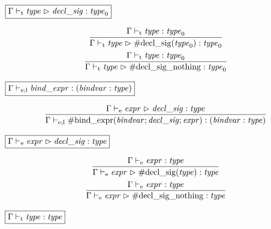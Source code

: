 $\fbox{$\Gamma \vdash_\mathrm{t} \mathit{type} \vartriangleright \mathit{decl\_sig}: \mathit{type}_0$}$

\begin{gather*}
    \infer{\Gamma \vdash_\mathrm{t} \mathit{type} \vartriangleright \mathrm{\#decl\_sig}(\mathit{type}_0): \mathit{type}_0}{
        \Gamma \vdash_\mathrm{t} \mathit{type}: \mathit{type}_0
    }
    \\
    \infer{\Gamma \vdash_\mathrm{t} \mathit{type} \vartriangleright \mathrm{\#decl\_sig\_nothing}: \mathit{type}_0}{
        \Gamma \vdash_\mathrm{t} \mathit{type}: \mathit{type}_0
    }
\end{gather*}

$\fbox{$\Gamma \vdash_{\mathrm{e}; \mathrm{l}} \mathit{bind\_expr}: (\mathit{bindvar}: \mathit{type})$}$

\begin{gather*}
    \infer{\Gamma \vdash_{\mathrm{e}; \mathrm{l}} \mathrm{\#bind\_expr}(\mathit{bindvar}; \mathit{decl\_sig}; \mathit{expr}): (\mathit{bindvar}: \mathit{type})}{
        \Gamma \vdash_\mathrm{e} \mathit{expr} \vartriangleright \mathit{decl\_sig}: \mathit{type}
    }
\end{gather*}

$\fbox{$\Gamma \vdash_\mathrm{e} \mathit{expr} \vartriangleright \mathit{decl\_sig}: \mathit{type}$}$

\begin{gather*}
    \infer{\Gamma \vdash_\mathrm{e} \mathit{expr} \vartriangleright \mathrm{\#decl\_sig}(\mathit{type}): \mathit{type}}{
        \Gamma \vdash_\mathrm{e} \mathit{expr}: \mathit{type}
    }
    \\
    \infer{\Gamma \vdash_\mathrm{e} \mathit{expr} \vartriangleright \mathrm{\#decl\_sig\_nothing}: \mathit{type}}{
        \Gamma \vdash_\mathrm{e} \mathit{expr}: \mathit{type}
    }
\end{gather*}

$\fbox{$\Gamma \vdash_\mathrm{t} \mathit{type}: \mathit{type}$}$

